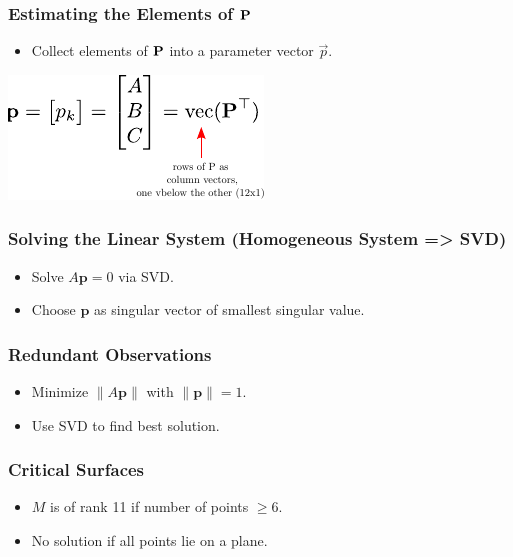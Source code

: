 \begin{frame}
  \frametitle{Estimating the Elements of $\boldsymbol{\mathbf{P}}$}
  \begin{itemize}
    \item Collect elements of $\boldsymbol{\mathbf{P}}$ into a parameter vector $\vec{p}$.
  \end{itemize}

  \begin{center}
    \includegraphics[width=0.5\columnwidth]{./images/projection_matrix_column_vector.pdf}
  \end{center}
  
\end{frame}

\begin{frame}
  \frametitle{Solving the Linear System (Homogeneous System => SVD)}
  \begin{itemize}
    \item Solve $A\mathbf{p}=0$ via SVD.
    \item Choose $\mathbf{p}$ as singular vector of smallest singular value.
  \end{itemize}
\end{frame}

\begin{frame}
  \frametitle{Redundant Observations}
  \begin{itemize}
    \item Minimize $\|A\mathbf{p}\|$ with $\|\mathbf{p}\|=1$.
    \item Use SVD to find best solution.
  \end{itemize}
\end{frame}

\begin{frame}
  \frametitle{Critical Surfaces}
  \begin{itemize}
    \item $M$ is of rank 11 if number of points $\ge 6$.
    \item No solution if all points lie on a plane.
  \end{itemize}
\end{frame}

